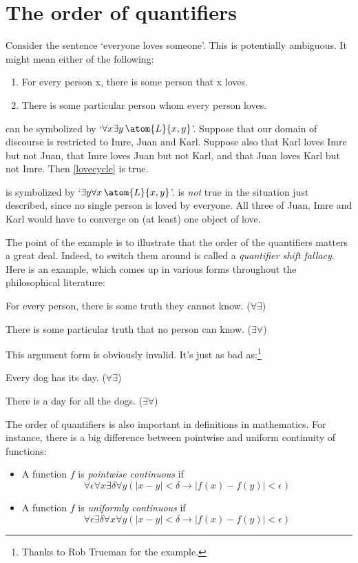 \section{The order of quantifiers}\label{ss:OrderQuant}
Consider the sentence `everyone loves someone'. This is potentially ambiguous. It might mean either of the following:
	\begin{enumerate}
		\item\label{lovecycle} For every person x, there is some person that x loves.
		\item\label{loveconverge} There is some particular person whom every person loves.
	\end{enumerate}
 can be symbolized by `$\forall x \exists y\, \atom{L}{x,y}$'. Suppose that our domain of discourse is restricted to Imre, Juan and Karl. Suppose also that Karl loves Imre but not Juan, that Imre loves Juan but not Karl, and that Juan loves Karl but not Imre. Then \cref*{lovecycle} is true.

 is symbolized by `$\exists y \forall x\,
\atom{L}{x,y}$'.  is \emph{not} true in the
situation just described, since no single person is loved by everyone.
All three of Juan, Imre and Karl would have to converge on (at least)
one object of love.

The point of the example is to illustrate that the order of the quantifiers matters a great deal. Indeed, to switch them around is called a \emph{quantifier shift fallacy}. Here is an example, which comes up in various forms throughout the philosophical literature:
	\begin{earg}
		\item[] For every person, there is some truth they cannot know. \hfill ($\forall \exists$)
		\item[\texttherefore] There is some particular truth that no person can know. \hfill ($\exists \forall$)
	\end{earg}
This argument form is obviously invalid. It's just as bad as:\footnote{Thanks to Rob Trueman for the example.}
	\begin{earg}
		\item[] Every dog has its day. \hfill ($\forall \exists$)
		\item[\texttherefore] There is a day for all the dogs. \hfill ($\exists \forall$)
	\end{earg}

The order of quantifiers is also important in definitions in mathematics.  For instance, there is a big difference between pointwise and uniform continuity of functions:
\begin{itemize}
\item A function $f$ is \emph{pointwise continuous} if
\[
\forall \epsilon\forall x\exists \delta\forall y(\left|x - y\right| < \delta \to \left|f(x) - f(y)\right| < \epsilon)
\]
\item A function $f$ is \emph{uniformly continuous} if
\[
\forall \epsilon\exists \delta\forall x\forall y(\left|x - y\right| < \delta \to \left|f(x) - f(y)\right| < \epsilon)
\]
\end{itemize}


